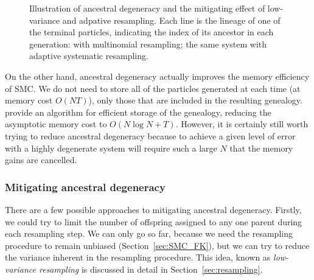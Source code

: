 \begin{figure}[ht]
\centering
{}
\caption[Ancestral degeneracy]{Illustration of ancestral degeneracy and the mitigating effect of low-variance and adpative resampling.
Each line is the lineage of one of the terminal particles, indicating the index of its ancestor in each generation:
 with multinomial resampling;
 the same system with adaptive systematic resampling.}
\label{fig:ancestral_degeneracy}
\end{figure}
On the other hand, ancestral degeneracy actually improves the memory efficiency of SMC. We do not need to store all of the particles generated at each time (at memory cost $O(NT)$), only those that are included in the resulting genealogy. \textcite{jacob2015} provide an algorithm for efficient storage of the genealogy, reducing the asymptotic memory cost to $O(N\log N+T)$.
However, it is certainly still worth trying to reduce ancestral degeneracy because to achieve a given level of error with a highly degenerate system will require such a large $N$ that the memory gains are cancelled.


\subsubsection{Mitigating ancestral degeneracy}
There are a few possible approaches to mitigating ancestral degeneracy.
Firstly, we could try to limit the number of offspring assigned to any one parent during each resampling step. We can only go so far, because we need the resampling procedure to remain unbiased (Section~\ref{sec:SMC_FK}), but we can try to reduce the variance inherent in the resampling procedure. This idea, known as \emph{low-variance resampling}\seb{[citation?]} is discussed in detail in Section~\ref{sec:resampling}.

